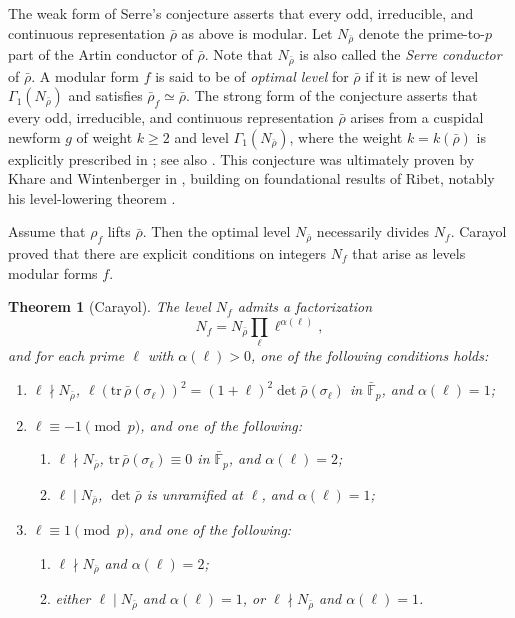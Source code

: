 \documentclass[table]{amsart}
\newtheorem{theorem}{Theorem}[section]
\newcommand{\F}{\mathbb{F}}
\numberwithin{equation}{section}
\begin{document}
\par The weak form of Serre’s conjecture \cite{serre1987representations} asserts that every odd, irreducible, and continuous representation $\bar{\rho}$ as above is modular. Let $N_{\bar{\rho}}$ denote the prime-to-$p$ part of the Artin conductor of $\bar{\rho}$. Note that $N_{\bar{\rho}}$ is also called the \emph{Serre conductor} of $\bar{\rho}$. A modular form $f$ is said to be of \emph{optimal level} for $\bar{\rho}$ if it is new of level $\Gamma_1(N_{\bar{\rho}})$ and satisfies $\bar{\rho}_f \simeq \bar{\rho}$. The strong form of the conjecture asserts that every odd, irreducible, and continuous representation $\bar{\rho}$ arises from a cuspidal newform $g$ of weight $k \geq 2$ and level $\Gamma_1(N_{\bar{\rho}})$, where the weight $k = k(\bar{\rho})$ is explicitly prescribed in \cite[§2]{serre1987representations}; see also \cite[p.11]{ribet1999lectures}. This conjecture was ultimately proven by Khare and Wintenberger in \cite{khare2009serre, khare2009serre2}, building on foundational results of Ribet, notably his level-lowering theorem \cite{ribetlevellowering}.

Assume that  $\rho_f$ lifts $\bar{\rho}$. Then the optimal level $N_{\bar{\rho}}$ necessarily divides $N_f$. Carayol \cite{carayol1989representations} proved that there are explicit conditions on integers $N_f$ that arise as levels modular forms $f$.

\begin{theorem}[Carayol]\label{carayol thm}
The level $N_f$ admits a factorization
\[
N_f = N_{\bar{\rho}} \prod_\ell \ell^{\alpha(\ell)},
\]
and for each prime $\ell$ with $\alpha(\ell) > 0$, one of the following conditions holds:
\begin{enumerate}
    \item $\ell \nmid N_{\bar{\rho}}$, $\ell(\mathrm{tr} \, \bar{\rho}(\sigma_\ell))^2 = (1+\ell)^2 \det \bar{\rho}(\sigma_\ell)$ in $\bar{\F}_p$, and $\alpha(\ell) = 1$;
    \item $\ell \equiv -1 \pmod{p}$, and one of the following:
    \begin{enumerate}
        \item $\ell \nmid N_{\bar{\rho}}$, $\mathrm{tr} \, \bar{\rho}(\sigma_\ell) \equiv 0$ in $\bar{\F}_p$, and $\alpha(\ell) = 2$;
        \item $\ell \mid N_{\bar{\rho}}$, $\det \bar{\rho}$ is unramified at $\ell$, and $\alpha(\ell) = 1$;
    \end{enumerate}
    \item $\ell \equiv 1 \pmod{p}$, and one of the following:
    \begin{enumerate}
        \item $\ell \nmid N_{\bar{\rho}}$ and $\alpha(\ell) = 2$;
        \item either $\ell \mid N_{\bar{\rho}}$ and $\alpha(\ell) = 1$, or $\ell \nmid N_{\bar{\rho}}$ and $\alpha(\ell) = 1$.
    \end{enumerate}
\end{enumerate}
\end{theorem}
\end{document}
